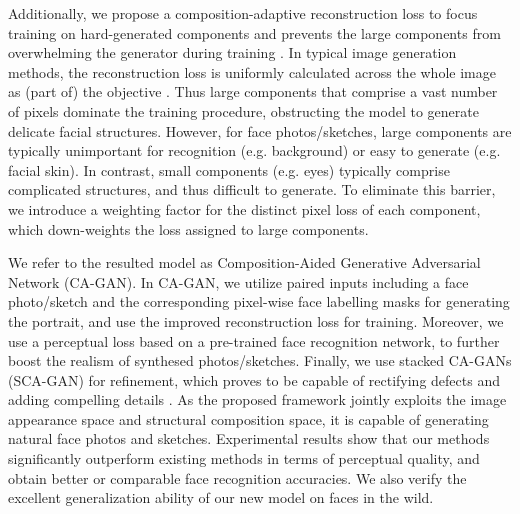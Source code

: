 \documentclass[journal]{IEEEtran}
\begin{document}
Additionally, we propose a composition-adaptive reconstruction loss to focus training on hard-generated components and prevents the large components from overwhelming the generator during training \cite{Lin2017Focal}. In typical image generation methods, the reconstruction loss is uniformly calculated across the whole image as (part of) the objective \cite{Isola2017Pix2Pix}. Thus large components that comprise a vast number of pixels dominate the training procedure, obstructing the model to generate delicate facial structures. However, for face photos/sketches, large components are typically unimportant for recognition (e.g. background) or easy to generate (e.g. facial skin). In contrast, small components (e.g. eyes) typically comprise complicated structures, and thus difficult to generate. To eliminate this barrier, we introduce a weighting factor for the distinct pixel loss of each component, which down-weights the loss assigned to large components. 

We refer to the resulted model as Composition-Aided Generative Adversarial Network (CA-GAN). In CA-GAN, we utilize paired inputs including a face photo/sketch and the corresponding pixel-wise face labelling masks for generating the portrait, and use the improved reconstruction loss for training. Moreover, we use a perceptual loss \cite{Johnson2016Perceptual} based on a pre-trained face recognition network, to further boost the realism of synthesed photos/sketches. Finally, we use stacked CA-GANs (SCA-GAN) for refinement, which proves to be capable of rectifying defects and adding compelling details \cite{Zhang2017StackGAN}. As the proposed framework jointly exploits the image appearance space and structural composition space, it is capable of generating natural face photos and sketches. Experimental results show that our methods significantly outperform existing methods in terms of perceptual quality, and obtain better or comparable face recognition accuracies. We also verify the excellent generalization ability of our new model on faces in the wild. 
\end{document}
